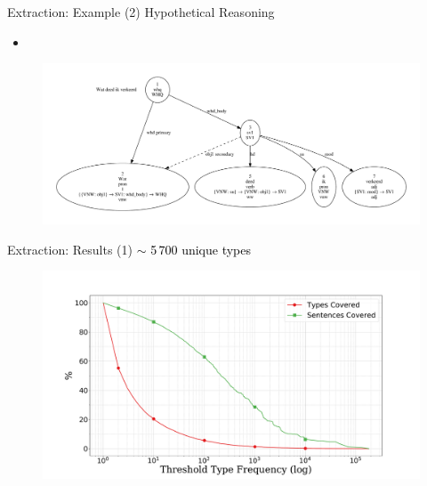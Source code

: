 \documentclass{beamer}
\begin{document}
{
\begin{frame}{Extraction: Example (2)}
\alert{Hypothetical Reasoning}
\begin{itemize}
\item[] \color{black}{When type assigning arguments, consider internal ``gaps''}
\end{itemize}

\begin{figure}
\includegraphics[scale=0.3]{deed2.pdf}
\end{figure}
\end{frame}
}

{
\begin{frame}{Extraction: Results (1)}
\centering
\vfill
\textcolor{black}{$\sim$ 5\,700 unique types}
\begin{figure}
\includegraphics[scale=0.24]{sparsity.pdf}
\end{figure}
\end{frame}
}
\end{document}
